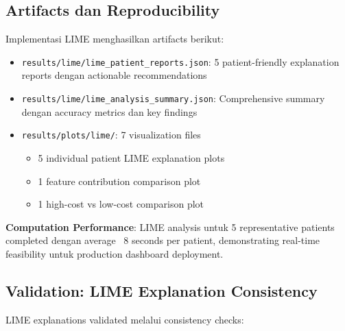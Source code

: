 \subsection{Artifacts dan Reproducibility}
\label{subsec:lime-artifacts}

Implementasi LIME menghasilkan artifacts berikut:

\begin{itemize}
    \item \texttt{results/lime/lime\_patient\_reports.json}: 5 patient-friendly explanation reports dengan actionable recommendations
    \item \texttt{results/lime/lime\_analysis\_summary.json}: Comprehensive summary dengan accuracy metrics dan key findings
    \item \texttt{results/plots/lime/}: 7 visualization files
    \begin{itemize}
        \item 5 individual patient LIME explanation plots
        \item 1 feature contribution comparison plot
        \item 1 high-cost vs low-cost comparison plot
    \end{itemize}
\end{itemize}

\textbf{Computation Performance}: LIME analysis untuk 5 representative patients completed dengan average ~8 seconds per patient, demonstrating real-time feasibility untuk production dashboard deployment.

\subsection{Validation: LIME Explanation Consistency}
\label{subsec:lime-validation}

LIME explanations validated melalui consistency checks:

